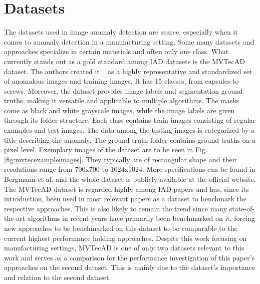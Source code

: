 \section{Datasets}
\label{sec:datasets}
The datasets used in image anomaly detection are scarce, especially when it comes to anomaly detection in a manufacturing setting. Some many datasets and approaches specialize in certain materials \cite{FabricDataset_Tsang_2016} 
\cite{SteeltubeDataset_Yang_2021} \cite{magnetictiles_Huang_2018}
and often only one class. What currently stands out as a gold standard among IAD datasets is the MVTecAD \cite{MVTEC_Bergmann_2021} dataset. The authors created it  
as a highly representative and standardized set of anomalous images and training images. It has 15 classes, from capsules to screws. Moreover, the dataset provides image labels and segmentation 
ground truths, making it versatile and applicable to multiple algorithms. The masks come as black and white grayscale images, while the image labels are given through its folder structure. 
Each class contains train images consisting of regular examples 
and test images. The data among the testing images is categorized by a title describing the anomaly. The ground truth folder contains 
ground truths on a pixel level.\newline
Exemplary images of the dataset are to be seen in Fig. \ref{fig:mvtecexampleimages}. They typically are of rectangular shape and their resolutions range from 
700x700 to 1024x1024. More specifications can be found in Bergmann et al. \cite{MVTEC_Bergmann_2021} and the whole dataset is publicly available at the official website\cite{mvtecdownload}.\newline
The MVTecAD\cite{MVTEC_Bergmann_2021} dataset is regarded highly among IAD papers and has, since its introduction, been used in most relevant papers as a dataset 
to benchmark the respective approaches. This is also likely to remain the trend since many state-of-the-art algorithms in recent years have primarily been benchmarked on it, forcing new approaches 
to be benchmarked on this dataset to be comparable to the current highest performance holding approaches. Despite this work focusing on manufacturing settings, MVTecAD is one of only two datasets relevant to this work 
and serves as a comparison for the performance investigation of this paper's approaches on the second dataset. This is mainly due to the dataset's importance and 
relation to the second dataset.



